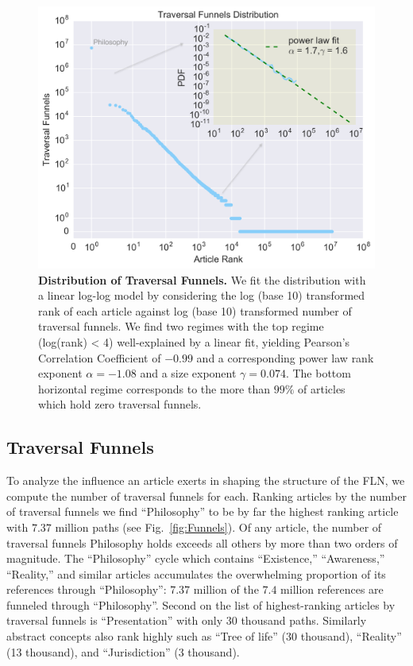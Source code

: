 \documentclass[pre,twocolumn,twoside,byrevtex,superscriptaddress,floatfix]{revtex4-1}
\begin{document}
\begin{figure}[tp!]
  \includegraphics[width=\columnwidth]{../graphics/funnels_distribution.png}
  \caption{
    \textbf{Distribution of Traversal Funnels.}
We fit the distribution with a linear log-log model by considering the log (base 10) transformed rank of each article against log (base 10) transformed number of traversal funnels. 
We find two regimes with the top regime (log(rank) < 4) 
well-explained by a linear fit, yielding Pearson's 
Correlation Coefficient of $-0.99$ and a 
corresponding power law rank exponent $\alpha = -1.08$
and a size exponent $\gamma = 0.074$. 
The bottom horizontal regime corresponds to the more than $99\%$ of articles
which hold zero traversal funnels.}
  \label{fig:Funnels Distribution}
\end{figure}

\subsection{Traversal Funnels}
\label{Traversal Funnels}

To analyze the influence an article exerts in shaping the 
structure of the FLN, we compute the number of traversal funnels for each.
Ranking articles by the number of traversal funnels we find 
``Philosophy'' to be by far the highest ranking article with 
$7.37$ million paths
(see Fig.~\ref{fig:Funnels}).
Of any article, the number of traversal funnels Philosophy holds exceeds 
all others by more than two orders of magnitude.
The ``Philosophy'' cycle which contains ``Existence,'' ``Awareness,'' ``Reality,'' 
and similar articles accumulates the overwhelming proportion of its 
references through ``Philosophy'': $7.37$ million of the $7.4$ million references
are funneled through ``Philosophy''.
Second on the list of highest-ranking articles by traversal funnels is 
``Presentation'' with only $30$ thousand paths. Similarly abstract 
concepts also rank highly such as ``Tree of life'' (30 thousand), 
``Reality'' (13 thousand), and ``Jurisdiction'' (3 thousand).
\end{document}

